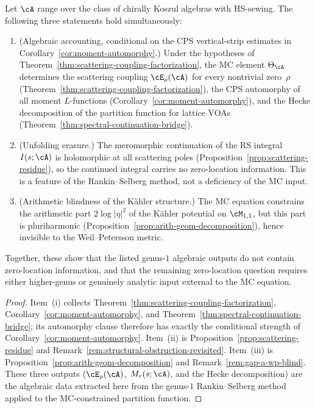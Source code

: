 \begin{theorem}%
\label{thm:structural-separation}%
%
%
Let $\cA$ range over the class of chirally Koszul algebras
with HS-sewing. The following three statements hold
simultaneously:
\begin{enumerate}[label=\textup{(\roman*)}]
\item \textup{(Algebraic accounting, conditional on the CPS
vertical-strip estimates in Corollary~\textup{\ref{cor:moment-automorphy}}.)}\quad
 Under the hypotheses of Theorem~\textup{\ref{thm:scattering-coupling-factorization}},
 the MC element $\Theta_\cA$ determines the scattering
 coupling $\cE_\rho(\cA)$ for every nontrivial zero~$\rho$
 \textup{(}Theorem~\textup{\ref{thm:scattering-coupling-factorization}}\textup{)},
 the CPS automorphy of all moment $L$-functions
 \textup{(}Corollary~\textup{\ref{cor:moment-automorphy}}\textup{)},
 and the Hecke decomposition of the partition function
 for lattice VOAs
 \textup{(}Theorem~\textup{\ref{thm:spectral-continuation-bridge}}\textup{)}.
\item \textup{(Unfolding erasure.)}\quad
 The meromorphic continuation of the RS integral $I(s;\cA)$
 is holomorphic at all scattering poles
 \textup{(}Proposition~\textup{\ref{prop:scattering-residue}}\textup{)},
 so the continued integral carries no zero-location
 information. This is a feature of the Rankin--Selberg
 method, not a deficiency of the MC input.
\item \textup{(Arithmetic blindness of the K\"ahler
 structure.)}\quad
 The MC equation constrains the arithmetic part
 $2\log\lvert\eta\rvert^2$ of the K\"ahler potential on
 $\cM_{1,1}$, but this part is pluriharmonic
 \textup{(}Proposition~\textup{\ref{prop:arith-geom-decomposition}}\textup{)},
 hence invisible to the Weil--Petersson metric.
\end{enumerate}
Together, these show that the listed genus-$1$ algebraic outputs do
not contain zero-location information, and that the remaining
zero-location question requires
either higher-genus or genuinely analytic input external to the
MC equation.
\end{theorem}

\begin{proof}
Item~(i) collects Theorem~\ref{thm:scattering-coupling-factorization},
Corollary~\ref{cor:moment-automorphy}, and
Theorem~\ref{thm:spectral-continuation-bridge}; its automorphy clause
therefore has exactly the conditional strength of
Corollary~\ref{cor:moment-automorphy}.
Item~(ii) is Proposition~\ref{prop:scattering-residue} and
Remark~\ref{rem:structural-obstruction-revisited}.
Item~(iii) is Proposition~\ref{prop:arith-geom-decomposition}
and Remark~\ref{rem:gap-a-wp-blind}.
These three outputs ($\cE_\rho(\cA)$, $M_r(s;\cA)$, and the
Hecke decomposition) are the algebraic data extracted here from the
genus-$1$ Rankin--Selberg method applied to the MC-constrained
partition function.
\end{proof}

